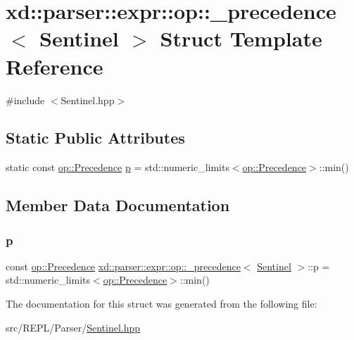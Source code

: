 \hypertarget{structxd_1_1parser_1_1expr_1_1op_1_1__precedence_3_01_sentinel_01_4}{}\section{xd\+:\+:parser\+:\+:expr\+:\+:op\+:\+:\+\_\+precedence$<$ Sentinel $>$ Struct Template Reference}
\label{structxd_1_1parser_1_1expr_1_1op_1_1__precedence_3_01_sentinel_01_4}


{\ttfamily \#include $<$Sentinel.\+hpp$>$}

\subsection*{Static Public Attributes}
\begin{DoxyCompactItemize}
\item 
static const \mbox{\hyperlink{namespacexd_1_1parser_1_1expr_1_1op_ae27abd4a02cd8125663cb2bacac299b2}{op\+::\+Precedence}} \mbox{\hyperlink{structxd_1_1parser_1_1expr_1_1op_1_1__precedence_3_01_sentinel_01_4_a98754fa5e6451cbc5345f9f742b95855}{p}} = std\+::numeric\+\_\+limits$<$\mbox{\hyperlink{namespacexd_1_1parser_1_1expr_1_1op_ae27abd4a02cd8125663cb2bacac299b2}{op\+::\+Precedence}}$>$\+::min()
\end{DoxyCompactItemize}


\subsection{Member Data Documentation}
\mbox{\label{structxd_1_1parser_1_1expr_1_1op_1_1__precedence_3_01_sentinel_01_4_a98754fa5e6451cbc5345f9f742b95855}} 
\subsubsection{\texorpdfstring{p}{p}}
{\footnotesize\ttfamily const \mbox{\hyperlink{namespacexd_1_1parser_1_1expr_1_1op_ae27abd4a02cd8125663cb2bacac299b2}{op\+::\+Precedence}} \mbox{\hyperlink{structxd_1_1parser_1_1expr_1_1op_1_1__precedence}{xd\+::parser\+::expr\+::op\+::\+\_\+precedence}}$<$ \mbox{\hyperlink{structxd_1_1parser_1_1expr_1_1op_1_1_sentinel}{Sentinel}} $>$\+::p = std\+::numeric\+\_\+limits$<$\mbox{\hyperlink{namespacexd_1_1parser_1_1expr_1_1op_ae27abd4a02cd8125663cb2bacac299b2}{op\+::\+Precedence}}$>$\+::min()\hspace{0.3cm}{\ttfamily [static]}}



The documentation for this struct was generated from the following file\+:\begin{DoxyCompactItemize}
\item 
src/\+R\+E\+P\+L/\+Parser/\mbox{\hyperlink{_sentinel_8hpp}{Sentinel.\+hpp}}\end{DoxyCompactItemize}
